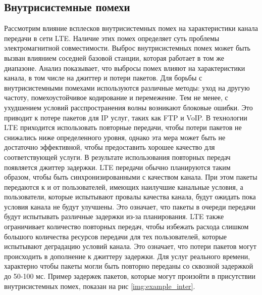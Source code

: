 \subsection{Внутрисистемные помехи}  \label{sect2_2_3}
Рассмотрим влияние всплесков внутрисистемных помех на характеристики канала передачи в сети LTE. Наличие этих помех определяет суть проблемы электромагнитной совместимости. 
Выброс внутрисистемных помех может быть вызван влиянием соседней базовой станции, которая работает в том же диапазоне.
Анализ показывает, что выбросы помех влияют на характеристики канала, в том числе на джиттер и потери пакетов.
Для борьбы с внутрисистемными помехами используются различные методы: уход на другую частоту, помехоустойчивое кодирование и перемежение. 
Тем не менее, с ухудшением условий расспространения волны возникают блоковые ошибки. 
Это приводит к потере пакетов для IP услуг, таких как FTP и VoIP. В технологии LTE приходится использовать повторные передачи, чтобы потери пакетов не снижались ниже определенного уровня, однако эта мера может быть не достаточно эффективной, чтобы предоставить хорошее качество для соответствующей услуги. В результате использования повторных передач появляется джиттер задержки.
LTE передачи обычно планируются таким образом, чтобы быть синхронизированными с качеством канала. При этом пакеты передаются к и от пользователей, имеющих наилучшие канальные условия, а пользователи, которые испытывают провалы качества канала, будут ожидать пока условия канала не будут улучшены. Это означает, что пакеты в очереди передачи будут испытывать различные задержки из-за планирования.
LTE также ограничивает количество повторных передач, чтобы избежать расхода слишком большого количества ресурсов передачи для тех пользователей, которые испытывают деградацию условий канала. Это означает, что потери пакетов могут происходить в дополнение к джиттеру задержки. Для услуг реального времени, характерно чтобы пакеты могли быть повторно переданы со сквозной задержкой до 50-100 мс.
Пример задержек пакетов, которые могут произойти в присутствии внутрисистемных помех, показан на рис \ref{img:example_inter}.



